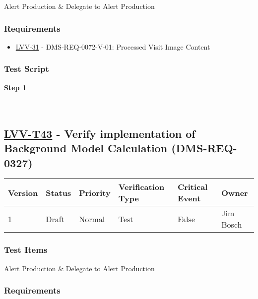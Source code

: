 Alert Production \& Delegate to Alert Production

\hypertarget{requirements-19}{%
\subsubsection{Requirements}\label{requirements-19}}

\begin{itemize}
\tightlist
\item
  \href{https://jira.lsstcorp.org/browse/LVV-31}{LVV-31} -
  DMS-REQ-0072-V-01: Processed Visit Image Content
\end{itemize}

\hypertarget{test-script-19}{%
\subsubsection{Test Script}\label{test-script-19}}

\textbf{Step 1}\\
~\\
~\\

\hypertarget{lvv-t43---verify-implementation-of-background-model-calculation-dms-req-0327}{%
\subsection{\texorpdfstring{\href{https://jira.lsstcorp.org/secure/Tests.jspa\#/testCase/LVV-T43}{LVV-T43}
- Verify implementation of Background Model Calculation
(DMS-REQ-0327)}{LVV-T43 - Verify implementation of Background Model Calculation (DMS-REQ-0327)}}\label{lvv-t43---verify-implementation-of-background-model-calculation-dms-req-0327}}

\begin{longtable}[]{@{}llllll@{}}
\toprule
Version & Status & Priority & Verification Type & Critical Event &
Owner\tabularnewline
\midrule
\endhead
1 & Draft & Normal & Test & False & Jim Bosch\tabularnewline
\bottomrule
\end{longtable}

\hypertarget{test-items-19}{%
\subsubsection{Test Items}\label{test-items-19}}

Alert Production \& Delegate to Alert Production

\hypertarget{requirements-20}{%
\subsubsection{Requirements}\label{requirements-20}}

